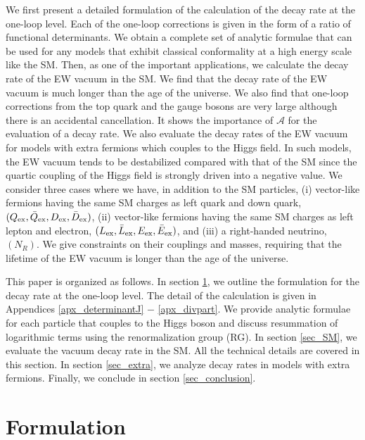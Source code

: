 \documentclass[12pt]{article}
\begin{document}
We first present a detailed formulation of the calculation of the
decay rate at the one-loop level. Each of the one-loop corrections is
given in the form of a ratio of functional determinants.  We obtain a
complete set of analytic formulae that can be used for any models that
exhibit classical conformality at a high energy scale like the SM.
Then, as one of the important applications, we calculate the decay
rate of the EW vacuum in the SM. We find that the decay rate of the EW
vacuum is much longer than the age of the universe. We also find that
one-loop corrections from the top quark and the gauge bosons are very
large although there is an accidental cancellation. It shows the
importance of $\mathcal A$ for the evaluation of a decay rate.  We
also evaluate the decay rates of the EW vacuum for models with extra
fermions which couples to the Higgs field.  In such models, the EW
vacuum tends to be destabilized compared with that of the SM
\cite{Kobakhidze:2013pya, Khan:2012zw, Dev:2013ff, Rodejohann:2012px,
  Xiao:2014kba} since the quartic coupling of the Higgs field is
strongly driven into a negative value. We consider three cases where
we have, in addition to the SM particles, (i) vector-like fermions
having the same SM charges as left quark and down quark, $(Q_{\rm
  ex},\bar{Q}_{\rm ex}, D_{\rm ex}, \bar{D}_{\rm ex})$, (ii)
vector-like fermions having the same SM charges as left lepton and
electron, $(L_{\rm ex},\bar{L}_{\rm ex}, E_{\rm ex}, \bar{E}_{\rm
  ex})$, and (iii) a right-handed neutrino, $(N_R)$. We give
constraints on their couplings and masses, requiring that the lifetime
of the EW vacuum is longer than the age of the universe.


This paper is organized as follows. In section \ref{sec_formulation},
we outline the formulation for the decay rate at the one-loop
level. The detail of the calculation is given in Appendices
\ref{apx_determinantJ} $-$ \ref{apx_divpart}.  We provide analytic
formulae for each particle that couples to the Higgs boson and discuss
resummation of logarithmic terms using the renormalization group
(RG). In section \ref{sec_SM}, we evaluate the vacuum decay rate in
the SM. All the technical details are covered in this section. In
section \ref{sec_extra}, we analyze decay rates in models with extra
fermions. Finally, we conclude in section \ref{sec_conclusion}.

\section{Formulation}
\label{sec_formulation}
\setcounter{equation}{0}
\end{document}
